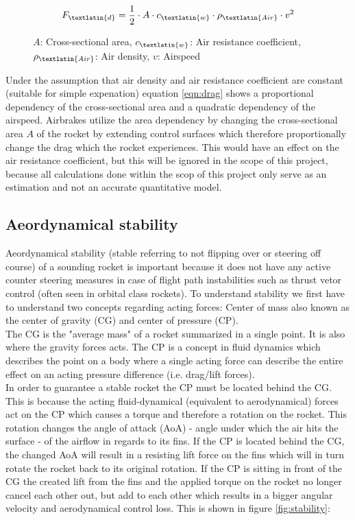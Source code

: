 \documentclass[fontsize=11pt,%
twoside,%
BCOR          = 8mm, %
DIV           = 11,  %
titlepage     = off,%
index=totoc,%
xcolor        = pdftex,%
dvipsnames,%
bibliography  = totoc,%
bibliography = numbered, %
listof        = notnumbered]{scrreprt}
\begin{document}
\begin{figure}[!ht]
	\captionsetup{font=footnotesize}
	\begin{equation}
		F_\textlatin{d} = \frac{1}{2} \cdot A \cdot c_\textlatin{w} \cdot \rho_\textlatin{Air} \cdot v^2
		\label{eqn:drag}
	\end{equation}
	\caption[equation]{$A$: Cross-sectional area, $c_\textlatin{w}$: Air resistance coefficient, $\rho_\textlatin{Air}$: Air density, $v$: Airspeed} 
\end{figure}
	
\noindent Under the assumption that air density and air resistance coefficient are constant (suitable for simple expenation) equation \ref{eqn:drag} shows a proportional dependency of the cross-sectional area and a quadratic dependency of the airspeed. Airbrakes utilize the area dependency by changing the cross-sectional area $A$ of the rocket by extending control surfaces which therefore proportionally change the drag which the rocket experiences. This would have an effect on the air resistance coefficient, but this will be ignored in the scope of this project, because all calculations done within the scop of this project only serve as an estimation and not an accurate quantitative model.\\

\subsection{Aeordynamical stability}
Aeordynamical stability (stable referring to not flipping over or steering off course) of a sounding rocket is important because it does not have any active counter steering measures in case of flight path instabilities such as thrust vetor control (often seen in orbital class rockets). To understand stability we first have to understand two concepts regarding acting forces: Center of mass also known as the center of gravity (CG) and center of pressure (CP).\\
The CG is the "average mass" of a rocket summarized in a single point. It is also where the gravity forces acts. The CP is a concept in fluid dynamics which describes the point on a body where a single acting force can describe the entire effect on an acting pressure difference (i.e. drag/lift forces).\\
In order to guarantee a stable rocket the CP must be located behind the CG. This is because the acting fluid-dynamical (equivalent to aerodynamical) forces act on the CP which causes a torque and therefore a rotation on the rocket. This rotation changes the angle of attack (AoA) - angle under which the air hits the surface - of the airflow in regards to its fins. If the CP is located behind the CG, the changed AoA will result in a resisting lift force on the fins which will in turn rotate the rocket back to its original rotation. If the CP is sitting in front of the CG the created lift from the fins and the applied torque on the rocket no longer cancel each other out, but add to each other which results in a bigger angular velocity and aerodynamical control loss. This is shown in figure \ref{fig:stability}:
\end{document}
